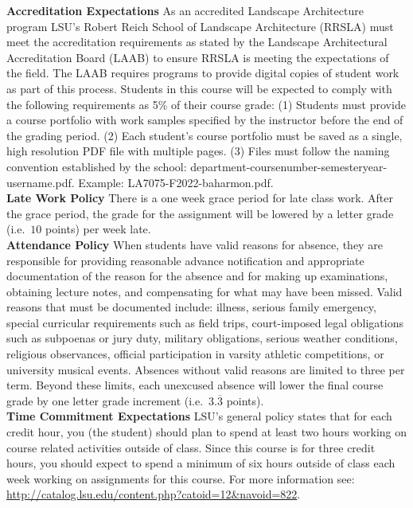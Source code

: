 \documentclass[11pt,article,oneside]{memoir}
\begin{document}
\noindent \textbf{Accreditation Expectations}
As an accredited Landscape Architecture program
LSU's Robert Reich School of Landscape Architecture (RRSLA) 
must meet the accreditation requirements 
as stated by the Landscape Architectural Accreditation
Board (LAAB) to ensure RRSLA is meeting the expectations of the field. 
The LAAB requires programs to provide digital copies 
of student work as part of this process.
Students in this course will be expected 
to comply with the following requirements
as 5\% of their course grade: 
(1) Students must provide a course portfolio
with work samples specified by the instructor 
before the end of the grading period. 
(2) Each student's course portfolio must be saved as 
a single, high resolution PDF file with multiple pages. 
(3) Files must follow the naming convention
established by the school: department-coursenumber-semesteryear-username.pdf.
Example: LA7075-F2022-baharmon.pdf.\\

\noindent \textbf{Late Work Policy}
There is a one week grace period for late class work. 
After the grace period, 
the grade for the assignment will be lowered by
a letter grade (i.e.~$10$ points) per week late.\\

\noindent \textbf{Attendance Policy}
When students have valid reasons for absence, they are responsible for providing reasonable advance notification and appropriate documentation of the reason for the absence and for making up examinations, obtaining lecture notes, and compensating for what may have been missed. Valid reasons that must be documented include: illness, serious family emergency, special curricular requirements such as field trips, court-imposed legal obligations such as subpoenas or jury duty, military obligations, serious weather conditions, religious observances, official participation in varsity athletic competitions, or university musical events. Absences without valid reasons are limited to three per term. Beyond these limits, each unexcused absence will lower the final course grade by one letter grade increment (i.e.~$3.\overline{3}$ points).\\

\noindent \textbf{Time Commitment Expectations}
LSU's general policy states that for each credit hour, you (the student) should plan to
spend at least two hours working on course related activities outside of class. Since this course is for three credit hours, you should expect to spend a minimum of six hours outside of class each week working on assignments for this course. For more information see: 
\url{http://catalog.lsu.edu/content.php?catoid=12&navoid=822}.\\
\end{document}
